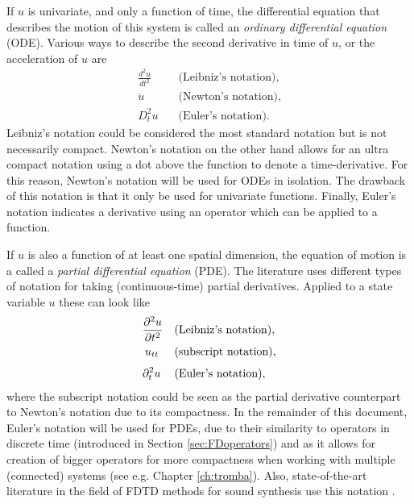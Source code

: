 If $u$ is univariate, and only a function of time, the differential equation that describes the motion of this system is called an \textit{ordinary differential equation} (ODE). Various ways to describe the second derivative in time of $u$, or the acceleration of $u$ are
%
\begin{equation}\nonumber
    \begin{aligned}
        \frac{d^2 u}{d t^2} & \quad \text{(Leibniz's notation)},\\
        \ddot u\ \  &\quad \text{(Newton's notation)},\\[3pt]
        D_t^2 u& \quad \text{(Euler's notation)}.
    \end{aligned}
\end{equation}
%
Leibniz's notation could be considered the most standard notation but is not necessarily compact. Newton's notation on the other hand allows for an ultra compact notation using a dot above the function to denote a time-derivative. For this reason, Newton's notation will be used for ODEs in isolation. The drawback of this notation is that it only be used for univariate functions. Finally, Euler's notation indicates a derivative using an operator which can be applied to a function. 
 
If $u$ is also a function of at least one spatial dimension, the equation of motion is a called a \textit{partial differential equation} (PDE).
The literature uses different types of notation for taking (continuous-time) partial derivatives. Applied to a state variable $u$ these can look like 
\begin{equation}\nonumber
    \begin{aligned}
        \frac{\partial^2 u}{\partial t^2} & \quad \text{(Leibniz's notation)},\\
        u_{tt}\:\,& \quad \text{(subscript notation)},\\[3pt]
        \partial_t^2 u\: & \quad \text{(Euler's notation)},
    \end{aligned}
\end{equation}
% 
%
%
where the subscript notation could be seen as the partial derivative counterpart to Newton's notation due to its compactness. In the remainder of this document, Euler's notation will be used for PDEs, due to their similarity to operators in discrete time (introduced in Section \ref{sec:FDoperators}) and as it allows for creation of bigger operators for more compactness when working with multiple (connected) systems (see e.g. Chapter \ref{ch:tromba}). Also, state-of-the-art literature in the field of FDTD methods for sound synthesis use this notation \cite{Bilbao2018}.

